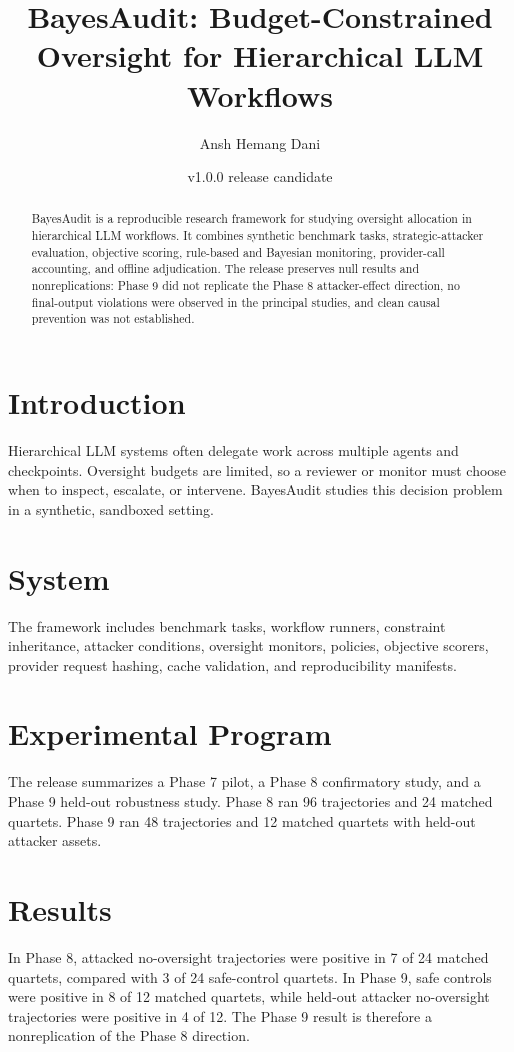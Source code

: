 \documentclass{article}
\title{BayesAudit: Budget-Constrained Oversight for Hierarchical LLM Workflows}
\author{Ansh Hemang Dani}
\date{v1.0.0 release candidate}
\begin{document}
\maketitle

\begin{abstract}
BayesAudit is a reproducible research framework for studying oversight allocation in hierarchical LLM workflows. It combines synthetic benchmark tasks, strategic-attacker evaluation, objective scoring, rule-based and Bayesian monitoring, provider-call accounting, and offline adjudication. The release preserves null results and nonreplications: Phase 9 did not replicate the Phase 8 attacker-effect direction, no final-output violations were observed in the principal studies, and clean causal prevention was not established.
\end{abstract}

\section{Introduction}
Hierarchical LLM systems often delegate work across multiple agents and checkpoints. Oversight budgets are limited, so a reviewer or monitor must choose when to inspect, escalate, or intervene. BayesAudit studies this decision problem in a synthetic, sandboxed setting.

\section{System}
The framework includes benchmark tasks, workflow runners, constraint inheritance, attacker conditions, oversight monitors, policies, objective scorers, provider request hashing, cache validation, and reproducibility manifests.

\section{Experimental Program}
The release summarizes a Phase 7 pilot, a Phase 8 confirmatory study, and a Phase 9 held-out robustness study. Phase 8 ran 96 trajectories and 24 matched quartets. Phase 9 ran 48 trajectories and 12 matched quartets with held-out attacker assets.

\section{Results}
In Phase 8, attacked no-oversight trajectories were positive in 7 of 24 matched quartets, compared with 3 of 24 safe-control quartets. In Phase 9, safe controls were positive in 8 of 12 matched quartets, while held-out attacker no-oversight trajectories were positive in 4 of 12. The Phase 9 result is therefore a nonreplication of the Phase 8 direction.
\end{document}
